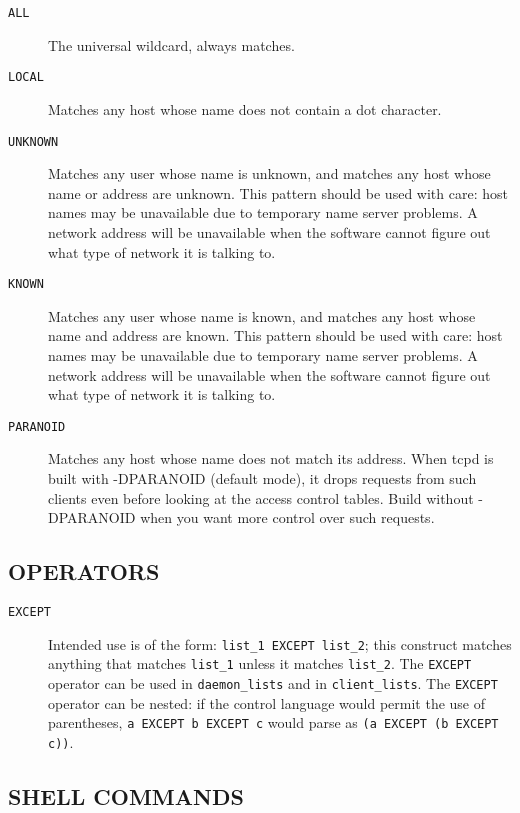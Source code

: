 \documentclass[11pt,twoside,onecolumn]{book}
\begin{document}
\begin{description}
\item[\tt ALL] The universal wildcard, always matches.
\item[\tt LOCAL] Matches any host whose name does not contain a dot character.
\item[\tt UNKNOWN] 
Matches any user whose name is unknown, and matches any host whose name
or address are unknown.  This pattern should be used with care:
host names may be unavailable due to temporary name server problems. A
network address will be unavailable when the software cannot figure out
what type of network it is talking to.
\item[\tt KNOWN]
Matches any user whose name is known, and matches any host whose name
and address are known. This pattern should be used with care:
host names may be unavailable due to temporary name server problems.  A
network address will be unavailable when the software cannot figure out
what type of network it is talking to.
\item[\tt PARANOID]
Matches any host whose name does not match its address.  When tcpd is
built with -DPARANOID (default mode), it drops requests from such
clients even before looking at the access control tables.  Build
without -DPARANOID when you want more control over such requests.

\end{description}

\subsection*{OPERATORS}

\begin{description}

\item[\tt EXCEPT]
Intended use is of the form: {\tt list\_1 EXCEPT list\_2}; this construct
matches anything that matches {\tt list\_1} unless it matches
{\tt list\_2}.  The {\tt EXCEPT} operator can be used in {\tt daemon\_lists} and in
{\tt client\_lists}. The {\tt EXCEPT} operator can be nested: if the control
language would permit the use of parentheses, {\tt a EXCEPT b EXCEPT c}
would parse as {\tt (a EXCEPT (b EXCEPT c))}.

\end{description}

\subsection*{SHELL COMMANDS}
\end{document}
